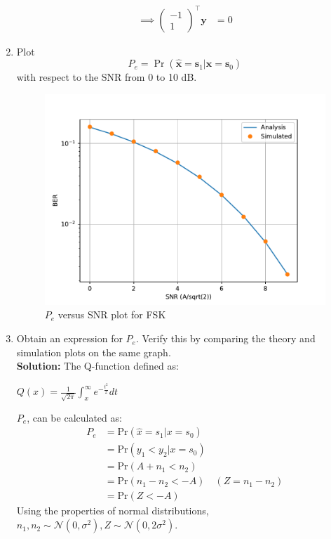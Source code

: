 \documentclass[12pt]{book}
\providecommand{\mbf}{\mathbf}
\providecommand{\pr}[1]{\ensuremath{\Pr\left(#1\right)}}
\providecommand{\brak}[1]{\ensuremath{\left(#1\right)}}
\newcommand{\solution}{\noindent \textbf{Solution: }}
\newcommand{\myvec}[1]{\ensuremath{\begin{pmatrix}#1\end{pmatrix}}}
\providecommand{\gauss}[2]{\mathcal{N}\ensuremath{\left(#1,#2\right)}}
\let\vec\mathbf
\begin{document}
\begin{enumerate}
\begin{align*}
\implies \myvec{-1\\1}^\top \vec{y} &= 0
\end{align*}
\item
Plot 
\begin{equation} 
P_e = \pr{\hat{\mbf{x}} = \mbf{s}_1|\mbf{x} = \mbf{s}_0}
\label{eq:5.1.3}
\end{equation}
with respect to the SNR from 0 to 10 dB.\\
\begin{center}
\end{center}
\begin{figure}[H]
\centering
\includegraphics[width=\columnwidth]{./figs/5/5.1.3.pdf}
\caption{$P_e$ versus SNR plot for FSK}
\label{fig:5.1.3}
\end{figure}

\item
Obtain an expression for $P_e$. Verify this by comparing the theory and simulation plots on the same graph.\\
\solution 
The Q-function defined as:

$Q(x) = \frac{1}{\sqrt{2\pi}}\int_{x}^{\infty} e^{-\frac{t^2}{2}} dt$

$P_e$, can be calculated as:
\begin{align*}
P_e &= \text{Pr}(\hat{x}=s_1|x=s_0)\\
& = \text{Pr}(y_1 < y_2|x=s_0)\\
& = \text{Pr}(A + n_1 < n_2)\\
& = \text{Pr}(n_1 - n_2 < -A)  \quad\brak{Z = n_1 - n_2}\\
& = \text{Pr}(Z < -A)      
\end{align*}
Using the properties of normal distributions,$n_1, n_2 \sim \gauss{0}{\sigma^2} ,Z \sim \gauss{0}{2\sigma^2}$.


\end{enumerate}
\end{document}
